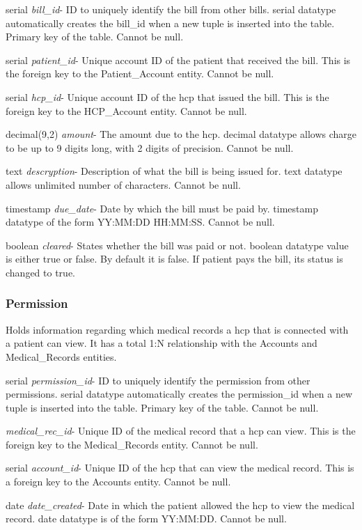\documentclass[10pt]{report}
\begin{document}
\begin{description}
\item serial \textit{bill\_id}-  ID to uniquely identify the bill from other bills. serial datatype automatically creates the bill\_id when a new tuple is inserted into the table.  Primary key of the table.  Cannot be null.
\item serial \textit{patient\_id}- Unique account ID of the patient that received the bill.  This is the foreign key to the Patient\_Account entity.  Cannot be null.
\item serial \textit{hcp\_id}- Unique account ID of the hcp that issued the bill.  This is the foreign key to the HCP\_Account entity.  Cannot be null.
\item decimal(9,2) \textit{amount}- The amount due to the hcp.  decimal datatype allows charge to be up to 9 digits long, with 2 digits of precision.  Cannot be null.
\item text \textit{descryption}- Description of what the bill is being issued for.  text datatype allows unlimited number of characters. Cannot be null.
\item timestamp \textit{due\_date}- Date by which the bill must be paid by.  timestamp datatype of the form YY:MM:DD HH:MM:SS.  Cannot be null.
\item boolean \textit{cleared}- States whether the bill was paid or not.  boolean datatype value is either true or false.  By default it is false.  If patient pays the bill, its status is changed to true.
\end{description}

\subsubsection{Permission}
Holds information regarding which medical records a hcp that is connected with a patient can view.  It has a total 1:N relationship with the Accounts and Medical\_Records entities.

\begin{description}
\item serial \textit{permission\_id}-  ID to uniquely identify the permission from other permissions. serial datatype automatically creates the permission\_id when a new tuple is inserted into the table.  Primary key of the table.  Cannot be null.
\item \textit{medical\_rec\_id}- Unique ID of the medical record that a hcp can view.  This is the foreign key to the Medical\_Records entity.  Cannot be null.
\item serial \textit{account\_id}- Unique ID of the hcp that can view the medical record.  This is a foreign key to the Accounts entity.  Cannot be null.
\item date \textit{date\_created}-  Date in which the patient allowed the hcp to view the medical record.  date datatype is of the form YY:MM:DD.  Cannot be null.
\end{description}
\end{document}
